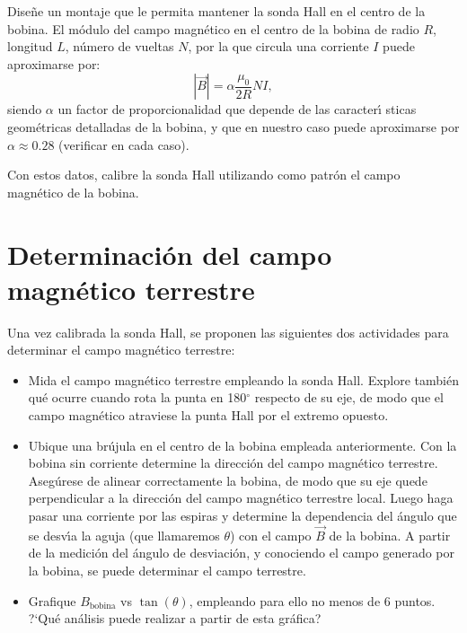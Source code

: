 \documentclass[laboratorio]{guia}
\begin{document}
Dise\~ne un montaje que le permita mantener la sonda Hall en el centro de la
bobina. El m\'odulo del campo magn\'etico en el centro de la bobina de radio $R$, longitud
$L$, n\'umero de vueltas $N$, por la que circula una corriente $I$ puede
aproximarse por:
\begin{equation}
    |\vec{B}| = \alpha \frac{\mu_0}{2R} N I,
    \end{equation}
siendo $\alpha$ un factor de proporcionalidad que depende de las caracter\'\i
sticas geom\'etricas detalladas de la bobina, y que en nuestro caso puede
aproximarse por $\alpha \approx 0.28$ (verificar en cada caso).

Con estos datos, calibre la sonda Hall utilizando como patr\'on el campo
magn\'etico de la bobina.


\section{Determinaci\'on del campo magn\'etico terrestre}

Una vez calibrada la sonda Hall, se proponen las siguientes dos actividades
para determinar el campo magn\'etico terrestre:
\begin{itemize}
    \item Mida el campo magn\'etico terrestre empleando la sonda Hall.
        Explore tambi\'en qu\'e ocurre cuando rota la punta en 180$^\circ$
        respecto de su eje, de modo que el campo magn\'etico atraviese la punta
        Hall por el extremo opuesto.

    \item Ubique una br\'ujula en el centro de la bobina empleada
        anteriormente. Con la bobina sin corriente determine la direcci\'on del
        campo magn\'etico terrestre. Aseg\'urese de alinear correctamente la
        bobina, de modo que su eje quede perpendicular a la direcci\'on del
        campo magn\'etico terrestre local. Luego haga pasar una corriente por
        las espiras y determine la dependencia del \'angulo que se desv\'\i a
        la aguja (que llamaremos $\theta$) con el campo $\vec{B}$ de la bobina. A partir de la medici\'on
        del \'angulo de desviaci\'on, y conociendo el campo generado por la
        bobina, se puede determinar el campo terrestre.

    \item Grafique $B_\text{bobina}$ vs $\tan \left( \theta \right)$, empleando
        para ello no menos de 6 puntos. ?`Qu\'e an\'alisis puede realizar a
        partir de esta gr\'afica?
\end{itemize}

\nocite{Alonso1998,Purcell1988,Reitz1996,Trelles1984}
 

\end{document}
